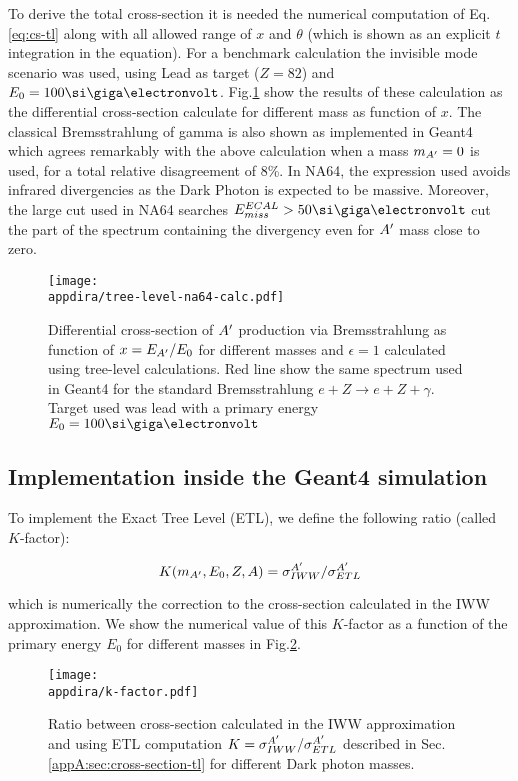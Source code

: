 To derive the total cross-section it is needed the numerical computation of Eq.\ref{eq:cs-tl} along with all allowed range of $x$ and $\theta$ (which is shown as an explicit $t$ integration in the equation). For a benchmark calculation the invisible mode scenario was used, using Lead as target ($Z = 82$) and $E_0 = 100 \gev$. Fig.\ref{fig:dp-cs-tl} show the results of these calculation as the differential cross-section calculate for different mass as function of $x$. The classical Bremsstrahlung of gamma is also shown as implemented in Geant4 which agrees remarkably with the above calculation when a mass $m_{A'} = 0$ is used, for a total relative disagreement of 8\%. In NA64, the expression used avoids infrared divergencies as the Dark Photon is expected to be massive. Moreover, the large cut used in NA64 searches $E^{ECAL}_{miss} > 50 \gev$ cut the part of the spectrum containing the divergency even for $A'$ mass close to zero.

\begin{figure}[bth!]
  \centering
  \texttt{[image: \\appdira/tree-level-na64-calc.pdf]}
  \caption[Tree level differential cross-section for different masses]{Differential cross-section of $A'$ production via Bremsstrahlung as function of $x=E_{A'}/E_0$ for different masses and $\epsilon = 1$ calculated using tree-level calculations. Red line show the same spectrum used in Geant4 for the standard Bremsstrahlung $e + Z \to e + Z + \gamma$. Target used was lead with a primary energy $E_0 = 100 \gev$ \cite{DMsimulation}}
  \label{fig:dp-cs-tl}
\end{figure}

\subsection{Implementation inside the Geant4 simulation}

To implement the Exact Tree Level (ETL), we define the following ratio (called $K$-factor):

\begin{equation}
  \label{eq:k-factor}
  K(m_{A'},E_0,Z,A) = \sigma^{A'}_{IWW} / \sigma^{A'}_{ETL}
\end{equation}

which is numerically the correction to the cross-section calculated in the IWW approximation. We show the numerical value of this $K$-factor as a function of the primary energy $E_0$ for different masses in Fig.\ref{fig:k-factor}.

\begin{figure}[bth!]
  \centering
  \texttt{[image: \\appdira/k-factor.pdf]}
  \caption{Ratio between cross-section calculated in the IWW approximation and using ETL computation $K = \sigma^{A'}_{IWW} / \sigma^{A'}_{ETL}$ described in Sec.\ref{appA:sec:cross-section-tl} for different Dark photon masses.}
  \label{fig:k-factor}
\end{figure}

